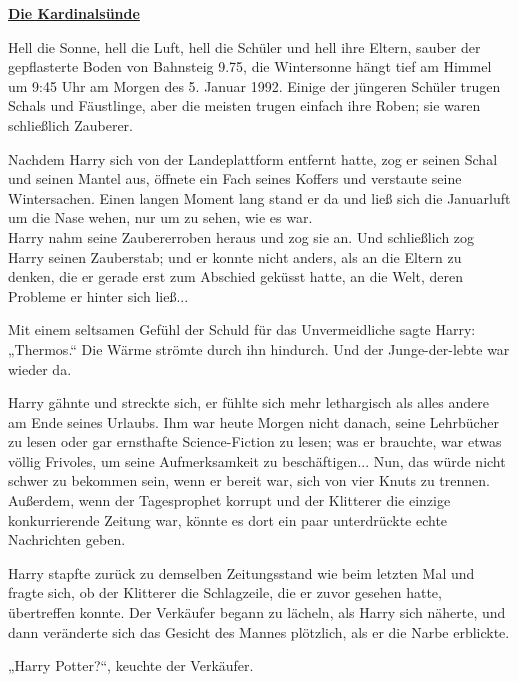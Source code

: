 

\hypertarget{die-kardinalsuxfcnde}{%

\textbf{\uline{Die Kardinalsünde}}

\hfill\break Hell die Sonne, hell die Luft, hell die Schüler und hell ihre Eltern, sauber der gepflasterte Boden von Bahnsteig 9.75, die Wintersonne hängt tief am Himmel um 9:45 Uhr am Morgen des 5. Januar 1992. Einige der jüngeren Schüler trugen Schals und Fäustlinge, aber die meisten trugen einfach ihre Roben; sie waren schließlich Zauberer.

Nachdem Harry sich von der Landeplattform entfernt hatte, zog er seinen Schal und seinen Mantel aus, öffnete ein Fach seines Koffers und verstaute seine Wintersachen. Einen langen Moment lang stand er da und ließ sich die Januarluft um die Nase wehen, nur um zu sehen, wie es war.\\ Harry nahm seine Zaubererroben heraus und zog sie an. Und schließlich zog Harry seinen Zauberstab; und er konnte nicht anders, als an die Eltern zu denken, die er gerade erst zum Abschied geküsst hatte, an die Welt, deren Probleme er hinter sich ließ...

Mit einem seltsamen Gefühl der Schuld für das Unvermeidliche sagte Harry: „Thermos.“ Die Wärme strömte durch ihn hindurch. Und der Junge-der-lebte war wieder da.

Harry gähnte und streckte sich, er fühlte sich mehr lethargisch als alles andere am Ende seines Urlaubs. Ihm war heute Morgen nicht danach, seine Lehrbücher zu lesen oder gar ernsthafte Science-Fiction zu lesen; was er brauchte, war etwas völlig Frivoles, um seine Aufmerksamkeit zu beschäftigen... Nun, das würde nicht schwer zu bekommen sein, wenn er bereit war, sich von vier Knuts zu trennen. Außerdem, wenn der Tagesprophet korrupt und der Klitterer die einzige konkurrierende Zeitung war, könnte es dort ein paar unterdrückte echte Nachrichten geben.

Harry stapfte zurück zu demselben Zeitungsstand wie beim letzten Mal und fragte sich, ob der Klitterer die Schlagzeile, die er zuvor gesehen hatte, übertreffen konnte. Der Verkäufer begann zu lächeln, als Harry sich näherte, und dann veränderte sich das Gesicht des Mannes plötzlich, als er die Narbe erblickte.

„Harry Potter?“, keuchte der Verkäufer.

}
